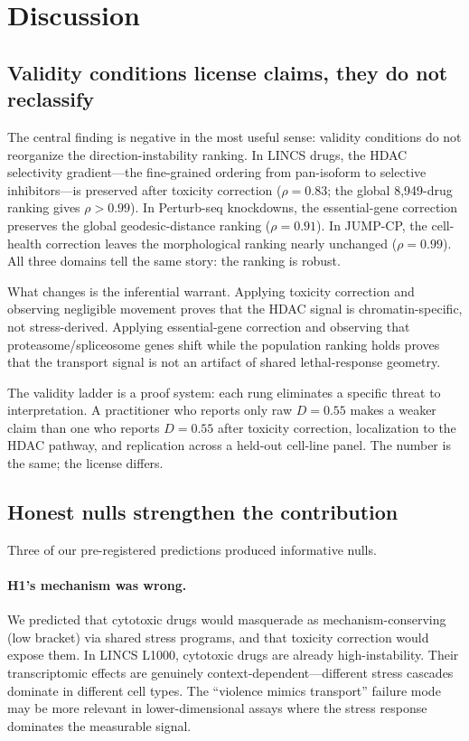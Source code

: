 \documentclass{article}
\begin{document}
\section{Discussion}

\subsection{Validity conditions license claims, they do not reclassify}

The central finding is negative in the most useful sense: validity conditions
do not reorganize the direction-instability ranking. In LINCS drugs, the
HDAC selectivity gradient---the fine-grained ordering from pan-isoform to
selective inhibitors---is preserved after toxicity correction ($\rho =
0.83$; the global 8{,}949-drug ranking gives $\rho > 0.99$). In Perturb-seq
knockdowns, the essential-gene correction preserves the global
geodesic-distance ranking ($\rho = 0.91$). In JUMP-CP, the cell-health
correction leaves the morphological ranking nearly unchanged ($\rho =
0.99$). All three domains tell the same story: the ranking is robust.

What changes is the inferential warrant. Applying toxicity correction and
observing negligible movement proves that the HDAC signal is
chromatin-specific, not stress-derived. Applying essential-gene correction
and observing that proteasome/spliceosome genes shift while the population
ranking holds proves that the transport signal is not an artifact of shared
lethal-response geometry.

The validity ladder is a proof system: each rung eliminates a specific threat
to interpretation. A practitioner who reports only raw $D = 0.55$ makes a
weaker claim than one who reports $D = 0.55$ after toxicity correction,
localization to the HDAC pathway, and replication across a held-out cell-line
panel. The number is the same; the license differs.

\subsection{Honest nulls strengthen the contribution}

Three of our pre-registered predictions produced informative nulls.

\paragraph{H1's mechanism was wrong.}
We predicted that cytotoxic drugs would masquerade as mechanism-conserving
(low bracket) via shared stress programs, and that toxicity correction would
expose them. In LINCS L1000, cytotoxic drugs are already high-instability.
Their transcriptomic effects are genuinely context-dependent---different stress
cascades dominate in different cell types. The ``violence mimics transport''
failure mode may be more relevant in lower-dimensional assays where the stress
response dominates the measurable signal.
\end{document}
